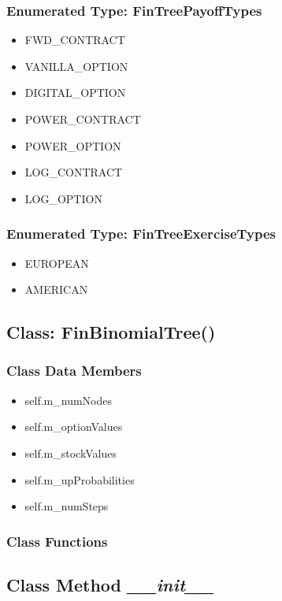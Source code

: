\documentclass[twoside,11pt]{book}
\begin{document}
\subsubsection{Enumerated Type: FinTreePayoffTypes}
\begin{itemize}
\item{FWD\_CONTRACT}
\item{VANILLA\_OPTION}
\item{DIGITAL\_OPTION}
\item{POWER\_CONTRACT}
\item{POWER\_OPTION}
\item{LOG\_CONTRACT}
\item{LOG\_OPTION}
\end{itemize}

\subsubsection{Enumerated Type: FinTreeExerciseTypes}
\begin{itemize}
\item{EUROPEAN}
\item{AMERICAN}
\end{itemize}

\subsection{Class: FinBinomialTree()}


\subsubsection{Class Data Members}
\begin{itemize}
\item{self.m\_numNodes}
\item{self.m\_optionValues}
\item{self.m\_stockValues}
\item{self.m\_upProbabilities}
\item{self.m\_numSteps}
\end{itemize}

\subsubsection{Class Functions}

\subsection{Class Method {\it \_\_init\_\_}}
\end{document}
